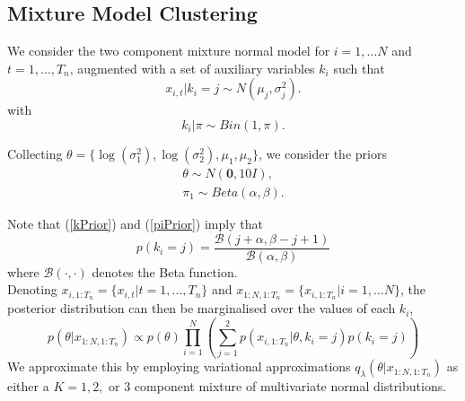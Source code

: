 \documentclass[12pt,a4paper]{article}\usepackage[]{graphicx}\usepackage[]{color}
\begin{document}
\subsection{Mixture Model Clustering}

We consider the two component mixture normal model for $i = 1, \dots N$ and $t = 1, \dots, T_n$, augmented with a set of auxiliary variables $k_i$ such that
\begin{equation}
\label{mixNormalDGP2}
x_{i, t} | k_i = j \sim  N(\mu_j, \sigma^2_{j}).
\end{equation}
with 
\begin{equation}
\label{kPrior}
k_i | \pi \sim Bin(1, \pi).
\end{equation}

Collecting $\theta = \{\log(\sigma^2_1), \log(\sigma^2_2), \mu_1, \mu_2 \}$, we consider the priors
\begin{align}
\theta \sim N(\boldsymbol{0}, 10 I), \\
\pi_1 \sim Beta(\alpha, \beta). \label{piPrior}
\end{align}

Note that (\ref{kPrior}) and (\ref{piPrior}) imply that 
\begin{equation}
\label{kMarginal}
p(k_i = j) = \frac{\mathcal{B}(j + \alpha, \beta - j + 1)}{\mathcal{B}(\alpha, \beta)}
\end{equation}
where $\mathcal{B}(\cdot, \cdot)$ denotes the Beta function.
\\

Denoting $x_{i, 1:T_n} = \{x_{i, t} | t = 1, \dots, T_n\}$ and $x_{1:N, 1:T_n} = \{x_{i, 1:T_n} | i = 1, \dots N \}$, the posterior distribution can then be marginalised over the values of each $k_i$,
\begin{equation}
\label{mixNormalMarginal}
p(\theta | x_{1:N, 1:T_n}) \propto p(\theta) \prod_{i=1}^N \left( \sum_{j=1}^2 p(x_{i, 1:T_n} | \theta, k_i = j) p(k_i = j) \right)
\end{equation}
We approximate this by employing variational approximations $q_{\lambda}(\theta | x_{1:N, 1:T_n})$ as either a $K = 1, 2,$ or $3$ component mixture of multivariate normal distributions. 
\\
\end{document}
